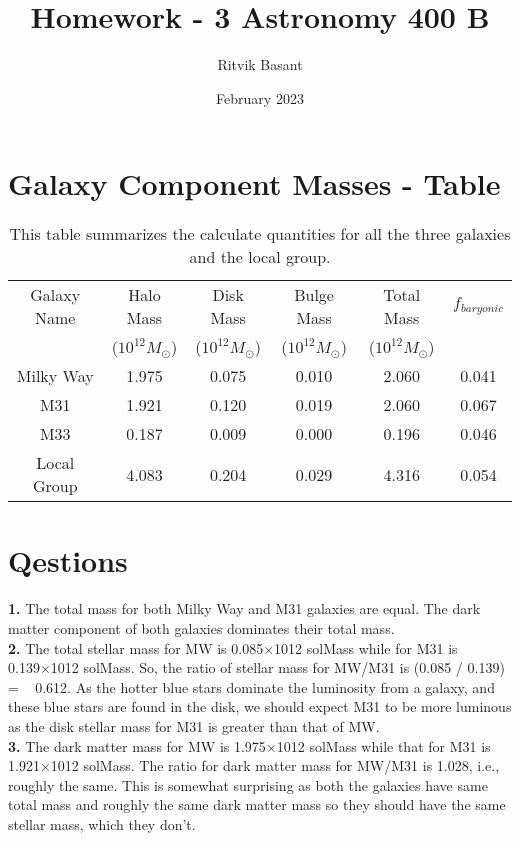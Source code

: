 \documentclass{article}
\title{Homework - 3 Astronomy 400 B}
\author{Ritvik Basant}
\date{February 2023}
\begin{document}
\maketitle

\section{Galaxy Component Masses - Table}

\begin{table}[ht]
    \centering
    \begin{tabular}{cccccc}
    \hline
        Galaxy Name & Halo Mass & Disk Mass & Bulge Mass & Total Mass & $f_{baryonic}$\\
         & ($10^{12} M_{\odot}$) & ($10^{12} M_{\odot}$) & ($10^{12} M_{\odot}$) & ($10^{12} M_{\odot}$) & \\
        \hline
        Milky Way & 1.975 & 0.075 & 0.010 & 2.060 & 0.041 \\
        M31 & 1.921 & 0.120 & 0.019 & 2.060 & 0.067 \\
        M33 & 0.187 & 0.009 & 0.000 & 0.196 & 0.046 \\
        \hline
        Local Group & 4.083 & 0.204 & 0.029 & 4.316 & 0.054\\
        \hline
    \end{tabular}
    \caption{This table summarizes the calculate quantities for all the three galaxies and the local group.}
    \label{tab:datap}
\end{table}

\section{Qestions}
\textbf{1.}	The total mass for both Milky Way and M31 galaxies are equal. The dark matter component of both galaxies dominates their total mass. \\

\noindent \textbf{2.}	The total stellar mass for MW is 0.085×1012 solMass while for M31 is 0.139×1012 solMass. So, the ratio of stellar mass for MW/M31 is (0.085 / 0.139) = ~ 0.612. As the hotter blue stars dominate the luminosity from a galaxy, and these blue stars are found in the disk, we should expect M31 to be more luminous as the disk stellar mass for M31 is greater than that of MW. \\

\noindent \textbf{3.}	The dark matter mass for MW is 1.975×1012 solMass while that for M31 is 1.921×1012 solMass. The ratio for dark matter mass for MW/M31 is 1.028, i.e., roughly the same. This is somewhat surprising as both the galaxies have same total mass and roughly the same dark matter mass so they should have the same stellar mass, which they don’t. \\
\end{document}
